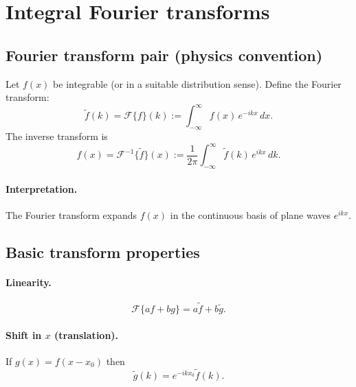 
\section{Integral Fourier transforms}

\subsection{Fourier transform pair (physics convention)}
Let $f(x)$ be integrable (or in a suitable distribution sense). Define the Fourier transform:
\begin{equation}
\tilde f(k) = \mathcal{F}\{f\}(k)
:= \int_{-\infty}^{\infty} f(x)\,e^{-ikx}\,dx.
\end{equation}
The inverse transform is
\begin{equation}
f(x) = \mathcal{F}^{-1}\{\tilde f\}(x)
:= \frac{1}{2\pi}\int_{-\infty}^{\infty} \tilde f(k)\,e^{ikx}\,dk.
\end{equation}

\paragraph{Interpretation.}
The Fourier transform expands $f(x)$ in the continuous basis of plane waves $e^{ikx}$.


\subsection{Basic transform properties}
\paragraph{Linearity.}
\begin{equation}
\mathcal{F}\{af+bg\} = a\tilde f + b\tilde g.
\end{equation}

\paragraph{Shift in $x$ (translation).}
If $g(x)=f(x-x_0)$ then
\begin{equation}
\tilde g(k) = e^{-ikx_0}\tilde f(k).
\end{equation}

